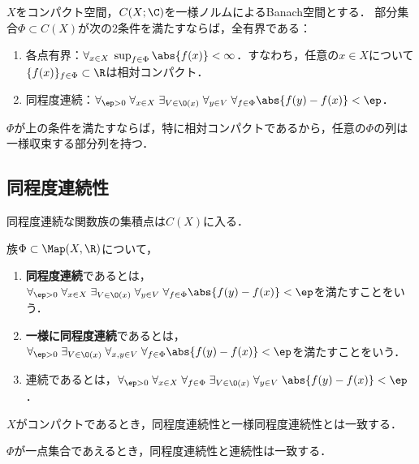 \documentclass[uplatex,dvipdfmx]{jsreport}
\begin{document}
\begin{theorem}
    $X$をコンパクト空間，$C(X;\C)$を一様ノルムによるBanach空間とする．
    部分集合$\Phi\subset C(X)$が次の2条件を満たすならば，全有界である：
    \begin{enumerate}
        \item 各点有界：$\forall_{x\in X}\;\sup_{f\in\Phi}\abs{f(x)}<\infty$．すなわち，任意の$x\in X$について$\{f(x)\}_{f\in\Phi}\subset\R$は相対コンパクト．
        \item 同程度連続：$\forall_{\ep>0}\;\forall_{x\in X}\;\exists_{V\in\O(x)}\;\forall_{y\in V}\;\forall_{f\in\Phi}\abs{f(y)-f(x)}<\ep$．
    \end{enumerate}
\end{theorem}

\begin{corollary}
    $\Phi$が上の条件を満たすならば，特に相対コンパクトであるから，任意の$\Phi$の列は一様収束する部分列を持つ．
\end{corollary}

\subsection{同程度連続性}

\begin{tcolorbox}[colframe=ForestGreen, colback=ForestGreen!10!white,breakable,colbacktitle=ForestGreen!40!white,coltitle=black,fonttitle=\bfseries\sffamily,
title=]
    同程度連続な関数族の集積点は$C(X)$に入る．
\end{tcolorbox}

\begin{definition}
    族$\Phi\subset\Map(X,\R)$について，
    \begin{enumerate}
        \item \textbf{同程度連続}であるとは，$\forall_{\ep>0}\;\forall_{x\in X}\;\exists_{V\in\O(x)}\;\forall_{y\in V}\;\forall_{f\in\Phi}\abs{f(y)-f(x)}<\ep$を満たすことをいう．
        \item \textbf{一様に同程度連続}であるとは，$\forall_{\ep>0}\;\exists_{V\in\O(x)}\;\forall_{x,y\in V}\;\forall_{f\in\Phi}\abs{f(y)-f(x)}<\ep$を満たすことをいう．
        \item 連続であるとは，$\forall_{\ep>0}\;\forall_{x\in X}\;\forall_{f\in\Phi}\;\exists_{V\in\O(x)}\;\forall_{y\in V}\;\abs{f(y)-f(x)}<\ep$．
    \end{enumerate}
    $X$がコンパクトであるとき，同程度連続性と一様同程度連続性とは一致する．
\end{definition}
\begin{remarks}
    $\Phi$が一点集合であえるとき，同程度連続性と連続性は一致する．
\end{remarks}
\end{document}
